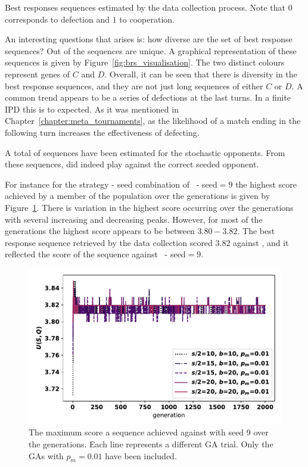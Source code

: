 \begin{table}[!htbp]
    \resizebox{\textwidth}{!}{
    }
    \caption{Best responses sequences estimated by the data collection process.
    Note that \(0\) corresponds to defection and \(1\) to cooperation.}
    \label{table:adaptive_best_responses}
\end{table}

An interesting questions that arises is: how diverse are the set of best
response sequences? Out of the \deterministicsequences sequences
\deterministicuniquesequences are unique. A graphical representation of these
sequences is given by Figure~\ref{fig:brs_visualisation}. The two distinct
colours represent genes of \(C\) and \(D\). Overall, it can be seen that there
is diversity in the best response sequences, and they are not just long
sequences of either \(C\) or \(D\). A common trend appears to be a series of
defections at the last turns. In a finite IPD this is to expected. As it was
mentioned in Chapter~\ref{chapter:meta_tournaments}, as the likelihood of a
match ending in the following turn increases the effectiveness of defecting.

A total of \stochasticsequences sequences have been estimated for the stochastic
opponents. From these sequences, \reproducible did indeed play against the
correct seeded opponent.

For instance for the strategy - seed combination of \Champion~- seed\(=9\) the highest score
achieved by a member of the population over the generations is given by
Figure~\ref{fig:champion_ga_score}. There is variation in the highest score
occurring over the generations with several increasing and decreasing peaks. However,
for most of the generations the highest score appears to be between \(3.80 - 3.82\).
The best response sequence retrieved by the data collection scored 3.82 against
\Champion, and it reflected the score of the sequence against \Champion~- seed\(=9\).

\begin{figure}[!htbp]
    \centering
    \includegraphics[width=.7\textwidth]{src/chapters/06/img/maximum_score_per_generation_champion.pdf}
    \caption{The maximum score a sequence achieved against \Champion with seed 9
    over the generations. Each line represents a different GA trial. Only the
    GAs with \(p_m=0.01\) have been included.}\label{fig:champion_ga_score}
\end{figure}

